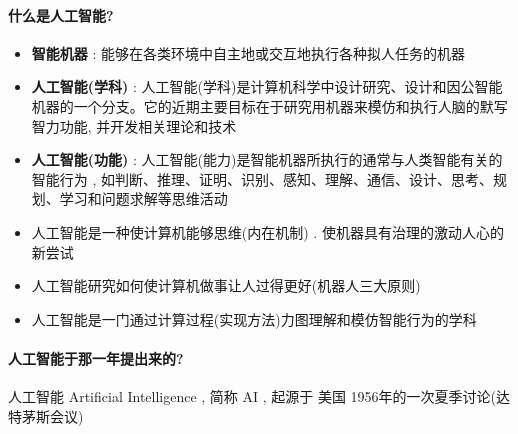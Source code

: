 \documentclass[UTF8,a4paper]{ctexart}
\begin{document}
\paragraph{什么是人工智能?}
\begin{itemize}
	\item \textbf{智能机器} : 能够在各类环境中自主地或交互地执行各种拟人任务的机器
	\item \textbf{人工智能(学科)} : 人工智能(学科)是计算机科学中设计研究、设计和因公智能机器的一个分支。它的近期主要目标在于研究用机器来模仿和执行人脑的默写智力功能, 并开发相关理论和技术
	\item \textbf{人工智能(功能)} : 人工智能(能力)是智能机器所执行的通常与人类智能有关的智能行为 , 如判断、推理、证明、识别、感知、理解、通信、设计、思考、规划、学习和问题求解等思维活动
	\item 人工智能是一种使计算机能够思维(内在机制) . 使机器具有治理的激动人心的新尝试
	\item 人工智能研究如何使计算机做事让人过得更好(机器人三大原则)
	\item 人工智能是一门通过计算过程(实现方法)力图理解和模仿智能行为的学科
\end{itemize}

\paragraph{人工智能于那一年提出来的?}人工智能 Artificial Intelligence , 简称 AI , 起源于 美国 1956年的一次夏季讨论(达特茅斯会议)
\end{document}

